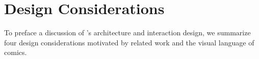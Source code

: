 \section{Design Considerations}
\label{sec:data_comics}
To preface a discussion of \toolname{}'s architecture and interaction design, we summarize four design considerations motivated by related work and the visual language of comics.


 
 
 





















